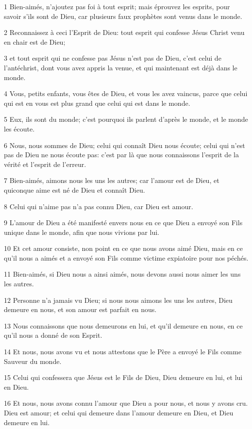 \par 1 Bien-aimés, n'ajoutez pas foi à tout esprit; mais éprouvez les esprits, pour savoir s'ils sont de Dieu, car plusieurs faux prophètes sont venus dans le monde.
\par 2 Reconnaissez à ceci l'Esprit de Dieu: tout esprit qui confesse Jésus Christ venu en chair est de Dieu;
\par 3 et tout esprit qui ne confesse pas Jésus n'est pas de Dieu, c'est celui de l'antéchrist, dont vous avez appris la venue, et qui maintenant est déjà dans le monde.
\par 4 Vous, petits enfants, vous êtes de Dieu, et vous les avez vaincus, parce que celui qui est en vous est plus grand que celui qui est dans le monde.
\par 5 Eux, ils sont du monde; c'est pourquoi ils parlent d'après le monde, et le monde les écoute.
\par 6 Nous, nous sommes de Dieu; celui qui connaît Dieu nous écoute; celui qui n'est pas de Dieu ne nous écoute pas: c'est par là que nous connaissons l'esprit de la vérité et l'esprit de l'erreur.
\par 7 Bien-aimés, aimons nous les uns les autres; car l'amour est de Dieu, et quiconque aime est né de Dieu et connaît Dieu.
\par 8 Celui qui n'aime pas n'a pas connu Dieu, car Dieu est amour.
\par 9 L'amour de Dieu a été manifesté envers nous en ce que Dieu a envoyé son Fils unique dans le monde, afin que nous vivions par lui.
\par 10 Et cet amour consiste, non point en ce que nous avons aimé Dieu, mais en ce qu'il nous a aimés et a envoyé son Fils comme victime expiatoire pour nos péchés.
\par 11 Bien-aimés, si Dieu nous a ainsi aimés, nous devons aussi nous aimer les uns les autres.
\par 12 Personne n'a jamais vu Dieu; si nous nous aimons les uns les autres, Dieu demeure en nous, et son amour est parfait en nous.
\par 13 Nous connaissons que nous demeurons en lui, et qu'il demeure en nous, en ce qu'il nous a donné de son Esprit.
\par 14 Et nous, nous avons vu et nous attestons que le Père a envoyé le Fils comme Sauveur du monde.
\par 15 Celui qui confessera que Jésus est le Fils de Dieu, Dieu demeure en lui, et lui en Dieu.
\par 16 Et nous, nous avons connu l'amour que Dieu a pour nous, et nous y avons cru. Dieu est amour; et celui qui demeure dans l'amour demeure en Dieu, et Dieu demeure en lui.

